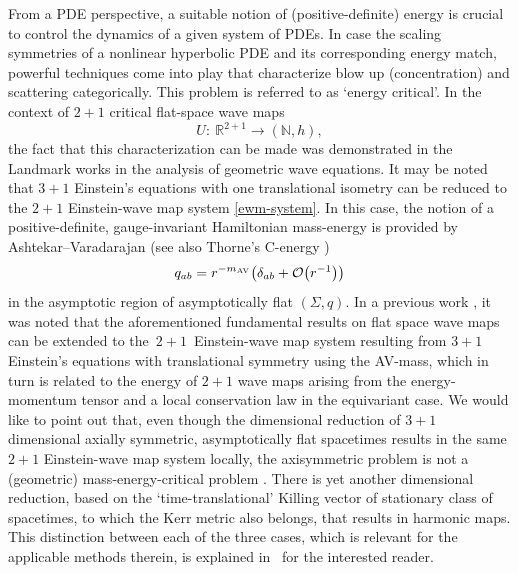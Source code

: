 \documentclass[pdftex]{sigma}
\numberwithin{equation}{section}
\begin{document}
From a PDE perspective, a suitable notion of (positive-definite) energy is crucial to control the dynamics of a given system of PDEs. In case the scaling symmetries of a nonlinear hyperbolic PDE and its corresponding energy match, powerful techniques come into play that characterize blow up (concentration) and scattering categorically. This problem is referred to as `energy critical'. In the context of $2 + 1$ critical flat-space wave maps
\[
U \colon\ \mathbb{R}^{2+1} \to (\mathbb{N}, h),
\]
the fact that this characterization can be made was demonstrated in the Landmark works \mbox{\cite{chris_tah1,krieg_schlag_ccwm,jal_tah1, jal_tah,sterb_tata_long,sterb_tata_main, struwe_sswm,struwe_equi,tao_all-I,tao_all-II,tao_all-III,tao_all-IV,tao_all-V,tao_all-VI,tao_all-VII}} in the analysis of geometric wave equations. It may be noted that $3 + 1$ Einstein’s equations with one translational isometry can be reduced to the $2 + 1$ Einstein-wave map system \eqref{ewm-system}. In this case, the notion of a positive-definite, gauge-invariant Hamiltonian mass-energy is provided by Ashtekar--Varadarajan \cite{ash_var} (see also Thorne's C-energy \cite{thorne_cenergy})
\begin{align*}
q_{ab} = r^{-m_{\rm AV}} \bigl(\delta_{ab} + \mathcal{O}\bigl(r^{-1}\bigr)\bigr)
\end{align*}
in the asymptotic region of asymptotically flat $(\Sigma, q)$. In a previous work \cite{diss_13}, it was noted that the aforementioned fundamental results on flat space wave maps can be extended to the~${2 + 1}$~Einstein-wave map system resulting from $3 + 1$ Einstein’s equations with translational symmetry using the AV-mass, which in turn is related to the energy of $2 + 1$ wave maps arising from the energy-momentum tensor and a local conservation law in the equivariant case. We would like to point out that, even though the dimensional reduction of $3 + 1$ dimensional axially symmetric, asymptotically flat spacetimes
results in the same $2 + 1$ Einstein-wave map system locally, the axisymmetric problem is not a (geometric) mass-energy-critical problem \cite{NG17}. There is yet another dimensional reduction, based on the ‘time-translational’ Killing vector of stationary class of spacetimes, to which the Kerr metric also belongs, that results in harmonic maps. This distinction between each of the three cases, which is relevant for the applicable methods therein, is explained in~\cite{NG17} for the interested reader.
\end{document}
